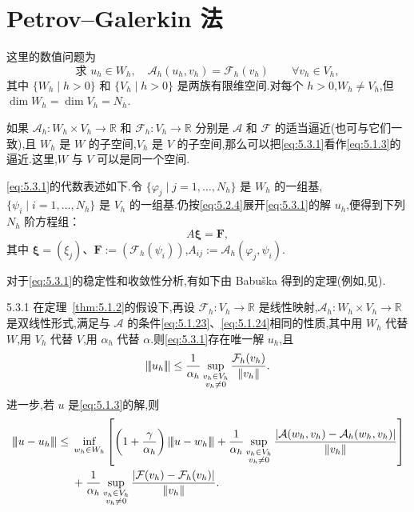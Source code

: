 \section{Petrov--Galerkin 法}\label{sec:5.3}

这里的数值问题为
\begin{equation}\label{eq:5.3.1}
  \text{求 }u_h\in W_h,\quad
  \mathcal A_h(u_h,v_h)=\mathcal F_h(v_h)\qquad\forall v_h\in V_h,
\end{equation}
其中 \(\{W_h\mid h>0\}\) 和 \(\{V_h\mid h>0\}\) 是两族有限维空间.对每个 \(h>0\),\(W_h\ne V_h\),但 \(\dim W_h=\dim V_h=N_h\).

如果 \(\mathcal A_h\colon W_h\times V_h\to\mathbb R\) 和 \(\mathcal F_h\colon V_h\to\mathbb R\) 分别是 \(\mathcal A\) 和 \(\mathcal F\) 的适当逼近(也可与它们一致),且 \(W_h\) 是 \(W\) 的子空间,\(V_h\) 是 \(V\) 的子空间,那么可以把\eqref{eq:5.3.1}看作\eqref{eq:5.1.3}的逼近.这里,\(W\) 与 \(V\) 可以是同一个空间.

\eqref{eq:5.3.1}的代数表述如下.令 \(\{\varphi_j\mid j=1,\ldots,N_h\}\) 是 \(W_h\) 的一组基,\(\{\psi_i\mid i=1,\ldots,N_h\}\) 是 \(V_h\) 的一组基.仍按\eqref{eq:5.2.4}展开\eqref{eq:5.3.1}的解 \(u_h\),便得到下列 \(N_h\) 阶方程组：
\begin{equation}\label{eq:5.3.2}
  A\boldsymbol{\xi}=\boldsymbol{F},
\end{equation}
其中 \(\boldsymbol{\xi}=(\xi_j)\)、\(\boldsymbol{F}:=(\mathcal F_h(\psi_i))\),\(A_{ij}:=\mathcal A_h(\varphi_j,\psi_i)\).

对于\eqref{eq:5.3.1}的稳定性和收敛性分析,有如下由 Babuška 得到的定理(例如,见).

\begin{theorem}[]{5.3.1}
在定理~\ref{thm:5.1.2}的假设下,再设 \(\mathcal F_h\colon V_h\to\mathbb R\) 是线性映射,\(\mathcal A_h\colon W_h\times V_h\to\mathbb R\) 是双线性形式,满足与 \(\mathcal A\) 的条件\eqref{eq:5.1.23}、\eqref{eq:5.1.24}相同的性质,其中用 \(W_h\) 代替 \(W\),用 \(V_h\) 代替 \(V\),用 \(\alpha_h\) 代替 \(\alpha\).则\eqref{eq:5.3.1}存在唯一解 \(u_h\),且
\begin{equation}\label{eq:5.3.3}
  \lVert\!\lvert u_h\rvert\!\rVert\le\frac1{\alpha_h}
    \sup_{\substack{v_h\in V_h\\v_h\ne0}}\frac{\mathcal F_h(v_h)}{\|v_h\|}.
\end{equation}
进一步,若 \(u\) 是\eqref{eq:5.1.3}的解,则
\begin{equation}\label{eq:5.3.4}
  \begin{aligned}
    \lVert\!\lvert u-u_h\rvert\!\rVert\le{}&
      \inf_{w_h\in W_h}\left[\left(1+\frac\gamma{\alpha_h}\right)\lVert\!\lvert u-w_h\rvert\!\rVert
       +\frac1{\alpha_h}\sup_{\substack{v_h\in V_h\\v_h\ne0}}
         \frac{|\mathcal A(w_h,v_h)-\mathcal A_h(w_h,v_h)|}{\|v_h\|}\right]\\
     &+\frac1{\alpha_h}\sup_{\substack{v_h\in V_h\\v_h\ne0}}
             \frac{|\mathcal F(v_h)-\mathcal F_h(v_h)|}{\|v_h\|}.
  \end{aligned}
\end{equation}
\end{theorem}

